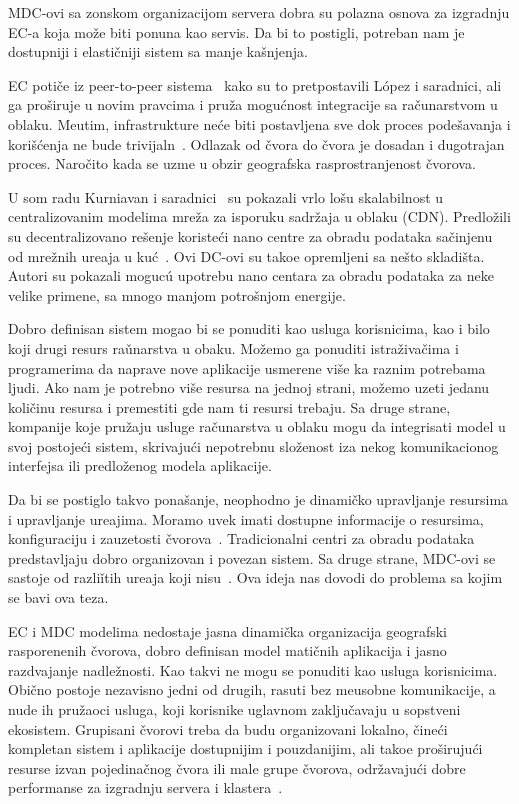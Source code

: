 MDC-ovi sa zonskom organizacijom servera dobra su polazna osnova za izgradnju EC-a koja mo\v ze biti ponu\dj na kao servis. Da bi to postigli, potreban nam je dostupniji i elasti\v cniji sistem sa manje ka\v snjenja.  

EC poti\v ce iz peer-to-peer sistema~\cite{LopezMEDHIBFR15} kako su to pretpostavili L{\'{o}}pez i saradnici, ali ga pro\v siruje u novim pravcima i pru\v za mogu\'cnost integracije sa ra\v cunarstvom u oblaku. Me\dj utim, infrastrukture ne\'ce biti postavljena sve dok proces pode\v savanja i kori\v s\'cenja ne bude trivijaln~\cite{SatyanarayananBCD09}. Odlazak od \v cvora do \v cvora je dosadan i dugotrajan proces. Naro\v cito kada se uzme u obzir geografska rasprostranjenost \v cvorova. 

U som radu Kurniavan i saradnici~\cite {inbookKurniawan} su pokazali vrlo lo\v su skalabilnost u centralizovanim modelima mre\v za za isporuku sadr\v zaja u oblaku (CDN). Predlo\v zili su decentralizovano re\v senje koriste\'ci nano centre za obradu podataka sa\v cinjenu od mrežnih ure\dj aja u ku\'c~\cite{inbookKurniawan}. Ovi DC-ovi su tako\dj e opremljeni sa ne\v sto skladi\v sta. Autori su pokazali moguc\'u upotrebu nano centara za obradu podataka za neke velike primene, sa mnogo manjom potro\v snjom energije.

Dobro definisan sistem mogao bi se ponuditi kao usluga korisnicima, kao i bilo koji drugi resurs ra\v unarstva u obaku. Mo\v zemo ga ponuditi istra\v ziva\v cima i programerima da naprave nove aplikacije usmerene vi\v se ka raznim potrebama ljudi. Ako nam je potrebno vi\v se resursa na jednoj strani, mo\v zemo uzeti jedanu koli\v cinu resursa i premestiti gde nam ti resursi trebaju. Sa druge strane, kompanije koje pru\v zaju usluge ra\v cunarstva u oblaku mogu da integrisati model u svoj postoje\'ci sistem, skrivaju\'ci nepotrebnu slo\v zenost iza nekog komunikacionog interfejsa ili predlo\v zenog modela aplikacije.

Da bi se postiglo takvo pona\v sanje, neophodno je dinami\v cko upravljanje resursima i upravljanje ure\dj ajima. Moramo uvek imati dostupne informacije o resursima, konfiguraciju i zauzetosti \v cvorova~\cite{GubbiBMP13, WangZZWYW17}. Tradicionalni centri za obradu podataka predstavljaju dobro organizovan i povezan sistem. Sa druge strane, MDC-ovi se sastoje od razli\v itih ure\dj aja koji nisu~\cite{JiangCGZW19}. Ova ideja nas dovodi do problema sa kojim se bavi ova teza.

EC i MDC modelima nedostaje jasna dinami\v cka organizacija geografski raspore\dj nenih \v cvorova, dobro definisan model mati\v cnih aplikacija i jasno razdvajanje nadle\v znosti. Kao takvi ne mogu se ponuditi kao usluga korisnicima. Obi\v cno postoje nezavisno jedni od drugih, rasuti bez me\dj usobne komunikacije, a nude ih pru\v zaoci usluga, koji korisnike uglavnom zaklju\v cavaju u sopstveni ekosistem. Grupisani \v cvorovi treba da budu organizovani lokalno, \v cine\'ci kompletan sistem i aplikacije dostupnijim i pouzdanijim, ali tako\dj e pro\v siruju\'ci resurse izvan pojedina\v cnog \v cvora ili male grupe \v cvorova, odr\v zavaju\'ci dobre performanse za izgradnju servera i klastera~\cite{ArocaG12}.

